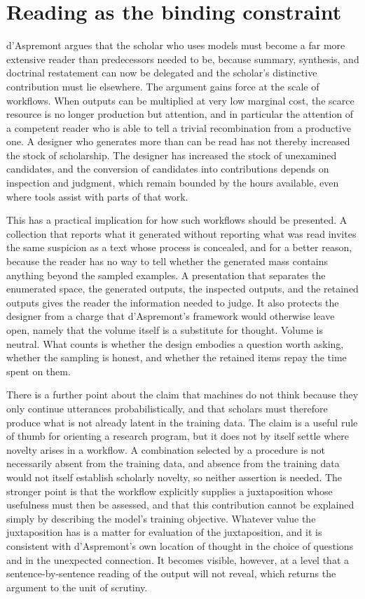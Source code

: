 \documentclass[12pt]{article}
\begin{document}
\section{Reading as the binding constraint}

d'Aspremont argues that the scholar who uses models must become a far more extensive reader than predecessors needed to be, because summary, synthesis, and doctrinal restatement can now be delegated and the scholar's distinctive contribution must lie elsewhere. The argument gains force at the scale of workflows. When outputs can be multiplied at very low marginal cost, the scarce resource is no longer production but attention, and in particular the attention of a competent reader who is able to tell a trivial recombination from a productive one. A designer who generates more than can be read has not thereby increased the stock of scholarship. The designer has increased the stock of unexamined candidates, and the conversion of candidates into contributions depends on inspection and judgment, which remain bounded by the hours available, even where tools assist with parts of that work.

This has a practical implication for how such workflows should be presented. A collection that reports what it generated without reporting what was read invites the same suspicion as a text whose process is concealed, and for a better reason, because the reader has no way to tell whether the generated mass contains anything beyond the sampled examples. A presentation that separates the enumerated space, the generated outputs, the inspected outputs, and the retained outputs gives the reader the information needed to judge. It also protects the designer from a charge that d'Aspremont's framework would otherwise leave open, namely that the volume itself is a substitute for thought. Volume is neutral. What counts is whether the design embodies a question worth asking, whether the sampling is honest, and whether the retained items repay the time spent on them.

There is a further point about the claim that machines do not think because they only continue utterances probabilistically, and that scholars must therefore produce what is not already latent in the training data. The claim is a useful rule of thumb for orienting a research program, but it does not by itself settle where novelty arises in a workflow. A combination selected by a procedure is not necessarily absent from the training data, and absence from the training data would not itself establish scholarly novelty, so neither assertion is needed. The stronger point is that the workflow explicitly supplies a juxtaposition whose usefulness must then be assessed, and that this contribution cannot be explained simply by describing the model's training objective. Whatever value the juxtaposition has is a matter for evaluation of the juxtaposition, and it is consistent with d'Aspremont's own location of thought in the choice of questions and in the unexpected connection. It becomes visible, however, at a level that a sentence-by-sentence reading of the output will not reveal, which returns the argument to the unit of scrutiny.
\end{document}
